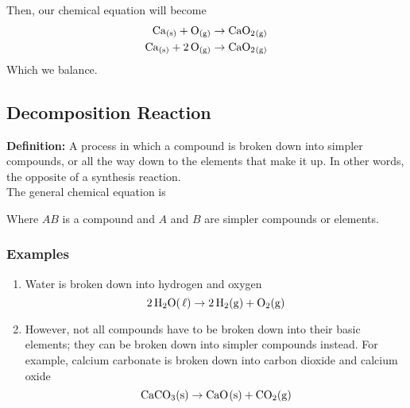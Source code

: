 \documentclass[12pt]{report}
\begin{document}
\begin{enumerate}
        Then, our chemical equation will become 
        \begin{align*}
            \ce{Ca_{(s)}}+ \ce{O_{(g)}} &\to \ce{CaO2_{(g)}}\\
            \ce{Ca_{(s)}}+ \ce{2O_{(g)}} &\to \ce{CaO2_{(g)}}
        \end{align*}
        Which we balance. 

\end{enumerate}

\subsection{Decomposition Reaction}
\textbf{Definition:} A process in which a compound is broken down into simpler compounds, or all the way down to the elements that make it up. In other words, the opposite of a synthesis reaction.\\

The general chemical equation is 

\begin{center}
\end{center}

Where $AB$ is a compound and $A$ and $B$ are simpler compounds or elements.\\

\subsubsection{Examples}
\begin{enumerate}
\setlength\itemsep{0.5em}
    \item{ Water is broken down into hydrogen and oxygen
            \[
                \ce{2H2O( \ell)}\to \ce{2H2(g)}+ \ce{O2(g)}
            \]
        }
    \item{However, not all compounds have to be broken down into their basic elements; they can be broken down into simpler compounds instead. For example, calcium carbonate is broken down into carbon dioxide and calcium oxide
            \[
                \ce{CaCO3(s)}\to \ce{CaO(s)}+ \ce{CO2(g)}
            \]
        }
    
\end{enumerate}
\end{document}
